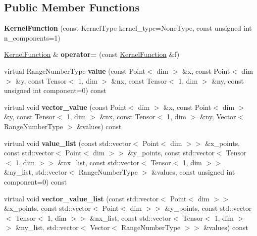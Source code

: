 \subsection*{Public Member Functions}
\begin{DoxyCompactItemize}
\item 
\mbox{\label{classLaplaceBEM_1_1LaplaceKernel_1_1KernelFunction_a1f10a1886e4b9aed7d60c036ccc81ee6}} 
{\bfseries Kernel\+Function} (const Kernel\+Type kernel\+\_\+type=None\+Type, const unsigned int n\+\_\+components=1)
\item 
\mbox{\label{classLaplaceBEM_1_1LaplaceKernel_1_1KernelFunction_a2a9a7e11aca4e52ece2d721e60a4bf56}} 
\hyperlink{classLaplaceBEM_1_1LaplaceKernel_1_1KernelFunction}{Kernel\+Function} \& {\bfseries operator=} (const \hyperlink{classLaplaceBEM_1_1LaplaceKernel_1_1KernelFunction}{Kernel\+Function} \&f)
\item 
\mbox{\label{classLaplaceBEM_1_1LaplaceKernel_1_1KernelFunction_aee6c638a4392616e89784d7b6558dd24}} 
virtual Range\+Number\+Type {\bfseries value} (const Point$<$ dim $>$ \&x, const Point$<$ dim $>$ \&y, const Tensor$<$ 1, dim $>$ \&nx, const Tensor$<$ 1, dim $>$ \&ny, const unsigned int component=0) const
\item 
\mbox{\label{classLaplaceBEM_1_1LaplaceKernel_1_1KernelFunction_aa8110379ffcda0d7aabeb1b9229fa8db}} 
virtual void {\bfseries vector\+\_\+value} (const Point$<$ dim $>$ \&x, const Point$<$ dim $>$ \&y, const Tensor$<$ 1, dim $>$ \&nx, const Tensor$<$ 1, dim $>$ \&ny, Vector$<$ Range\+Number\+Type $>$ \&values) const
\item 
\mbox{\label{classLaplaceBEM_1_1LaplaceKernel_1_1KernelFunction_a8ba5755bf65478154209736c001f2f2a}} 
virtual void {\bfseries value\+\_\+list} (const std\+::vector$<$ Point$<$ dim $>$$>$ \&x\+\_\+points, const std\+::vector$<$ Point$<$ dim $>$$>$ \&y\+\_\+points, const std\+::vector$<$ Tensor$<$ 1, dim $>$$>$ \&nx\+\_\+list, const std\+::vector$<$ Tensor$<$ 1, dim $>$$>$ \&ny\+\_\+list, std\+::vector$<$ Range\+Number\+Type $>$ \&values, const unsigned int component=0) const
\item 
\mbox{\label{classLaplaceBEM_1_1LaplaceKernel_1_1KernelFunction_ae906434f76ac27668ab4ddf91e3cd7fb}} 
virtual void {\bfseries vector\+\_\+value\+\_\+list} (const std\+::vector$<$ Point$<$ dim $>$$>$ \&x\+\_\+points, const std\+::vector$<$ Point$<$ dim $>$$>$ \&y\+\_\+points, const std\+::vector$<$ Tensor$<$ 1, dim $>$$>$ \&nx\+\_\+list, const std\+::vector$<$ Tensor$<$ 1, dim $>$$>$ \&ny\+\_\+list, std\+::vector$<$ Vector$<$ Range\+Number\+Type $>$$>$ \&values) const
\end{DoxyCompactItemize}
